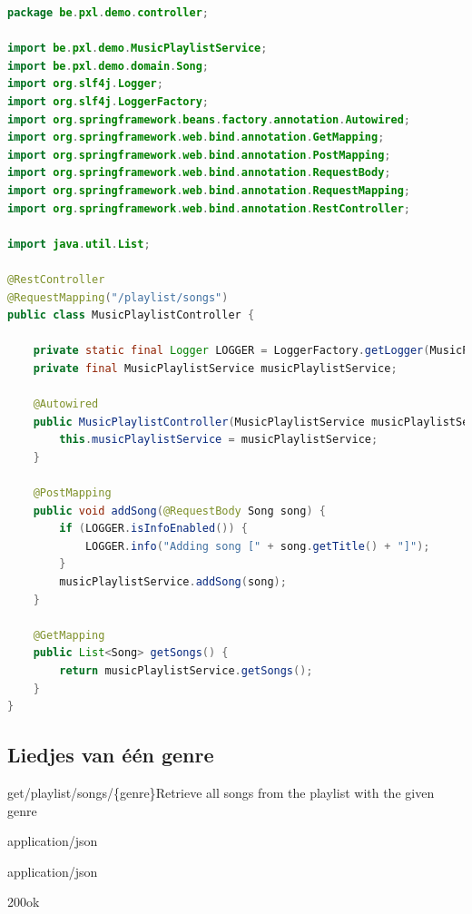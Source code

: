\begin{lstlisting}[language=java,  frame=single]
package be.pxl.demo.controller;

import be.pxl.demo.MusicPlaylistService;
import be.pxl.demo.domain.Song;
import org.slf4j.Logger;
import org.slf4j.LoggerFactory;
import org.springframework.beans.factory.annotation.Autowired;
import org.springframework.web.bind.annotation.GetMapping;
import org.springframework.web.bind.annotation.PostMapping;
import org.springframework.web.bind.annotation.RequestBody;
import org.springframework.web.bind.annotation.RequestMapping;
import org.springframework.web.bind.annotation.RestController;

import java.util.List;

@RestController
@RequestMapping("/playlist/songs")
public class MusicPlaylistController {

	private static final Logger LOGGER = LoggerFactory.getLogger(MusicPlaylistController.class);
	private final MusicPlaylistService musicPlaylistService;

	@Autowired
	public MusicPlaylistController(MusicPlaylistService musicPlaylistService) {
		this.musicPlaylistService = musicPlaylistService;
	}

	@PostMapping
	public void addSong(@RequestBody Song song) {
		if (LOGGER.isInfoEnabled()) {
			LOGGER.info("Adding song [" + song.getTitle() + "]");
		}
		musicPlaylistService.addSong(song);
	}

	@GetMapping
	public List<Song> getSongs() {
		return musicPlaylistService.getSongs();
	}
}
\end{lstlisting}

\subsection{Liedjes van \'e\'en genre}


 
 \begin{apiRoute}{get}{/playlist/songs/\{genre\}}{Retrieve all songs from the playlist with the given genre}
\begin{routeParameter}
\end{routeParameter}
\begin{routeRequest}{application/json}
\end{routeRequest}
\begin{routeResponse}{application/json}
\begin{routeResponseItem}{200}{ok}
\begin{routeResponseItemBody}
\end{routeResponseItemBody}
\end{routeResponseItem}
\end{routeResponse}
\end{apiRoute}


